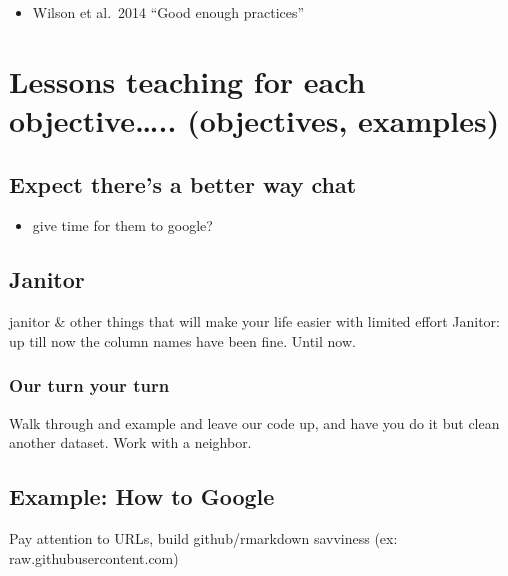\documentclass[]{book}
\providecommand{\tightlist}{%
  \setlength{\itemsep}{0pt}\setlength{\parskip}{0pt}}
\begin{document}
\begin{itemize}
\tightlist
\item
  Wilson et al.~2014 ``Good enough practices''
\end{itemize}

\hypertarget{lessons-teaching-for-each-objective..-objectives-examples}{%
\section{Lessons teaching for each objective\ldots{}.. (objectives, examples)}\label{lessons-teaching-for-each-objective..-objectives-examples}}

\hypertarget{expect-theres-a-better-way-chat}{%
\subsection{Expect there's a better way chat}\label{expect-theres-a-better-way-chat}}

\begin{itemize}
\tightlist
\item
  give time for them to google?
\end{itemize}

\hypertarget{janitor}{%
\subsection{Janitor}\label{janitor}}

janitor \& other things that will make your life easier with limited effort
Janitor: up till now the column names have been fine. Until now.

\hypertarget{our-turn-your-turn}{%
\subsubsection{Our turn your turn}\label{our-turn-your-turn}}

Walk through and example and leave our code up, and have you do it but clean another dataset. Work with a neighbor.

\hypertarget{example-how-to-google}{%
\subsection{Example: How to Google}\label{example-how-to-google}}

Pay attention to URLs, build github/rmarkdown savviness (ex: raw.githubusercontent.com)
\end{document}
